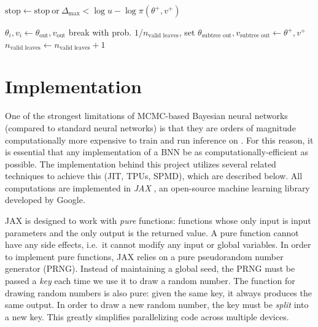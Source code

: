 \documentclass[12pt]{article}
\begin{document}
\begin{algorithm}
\begin{algorithmic}
		\State $\textrm{stop} \gets \textrm{stop} \ \textrm{or} \ \Delta_\mathrm{max} < \log u - \log \pi(\theta^+, v^+)$ 
			
			\State $\theta_i, v_i \gets \theta_\textrm{out}, v_\textrm{out}$ 
			\State break
		\Else
			 
				\State with prob. $1/n_\textrm{valid leaves}$, set $\theta_\textrm{subtree out}, v_\textrm{subtree out} \gets \theta^+, v^+$ 
				\State $n_\textrm{valid leaves} \gets n_\textrm{valid leaves} + 1$
			\EndIf
		\EndIf
		
	\EndFor
\EndFor
\end{algorithmic}
\end{algorithm}
\restoregeometry

\section{Implementation}

One of the strongest limitations of MCMC-based Bayesian neural networks (compared to standard neural networks) is that they are orders of magnitude computationally more expensive to train and run inference on \cite{bnn_posterior}. For this reason, it is essential that any implementation of a BNN be as computationally-efficient as possible. The implementation behind this project utilizes several related techniques to achieve this (JIT, TPUs, SPMD), which are described below. All computations are implemented in \textit{JAX} \cite{jax}, an open-source machine learning library developed by Google.

JAX is designed to work with \textit{pure} functions: functions whose only input is input parameters and the only output is the returned value. A pure function cannot have any side effects, i.e.\ it cannot modify any input or global variables. In order to implement pure functions, JAX relies on a pure pseudorandom number generator (PRNG). Instead of maintaining a global seed, the PRNG must be passed a \textit{key} each time we use it to draw a random number. The function for drawing random numbers is also pure: given the same key, it always produces the same output. In order to draw a new random number, the key must be \textit{split} into a new key. This greatly simplifies parallelizing code across multiple devices.  
\end{document}
